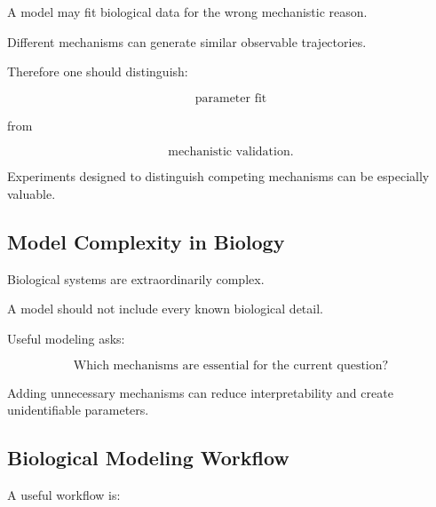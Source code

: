 A model may fit biological data for the wrong mechanistic reason.

Different mechanisms can generate similar observable trajectories.

Therefore one should distinguish:

\[
\boxed{
\text{parameter fit}
}
\]

from

\[
\boxed{
\text{mechanistic validation}.
}
\]

Experiments designed to distinguish competing mechanisms can be especially
valuable.

\subsection{Model Complexity in Biology}
\label{subsec:biological-model-complexity}

Biological systems are extraordinarily complex.

A model should not include every known biological detail.

Useful modeling asks:

\[
\boxed{
\text{Which mechanisms are essential for the current question?}
}
\]

Adding unnecessary mechanisms can reduce interpretability and create
unidentifiable parameters.

\subsection{Biological Modeling Workflow}
\label{subsec:biological-modeling-workflow}

A useful workflow is:

